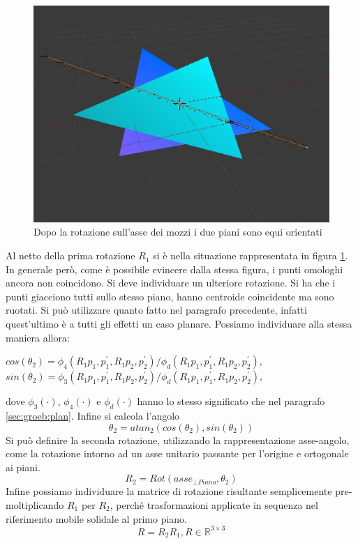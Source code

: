 \begin{figure}[h]
	\centering
	\includegraphics[width=420pt]{imgs/PianiSuStessoPiano.jpg}
	\caption{Dopo la rotazione sull'asse dei mozzi i due piani sono equi orientati}
	\label{rot:gb:samePlane}
\end{figure}

Al netto della prima rotazione $R_1$ si è nella situazione rappresentata in figura \ref{rot:gb:samePlane}. In generale però, come è possibile evincere dalla stessa figura, i punti omologhi ancora non coincidono. Si deve individuare un ulteriore rotazione.
Si ha che i punti giacciono tutti sullo stesso piano, hanno centroide coincidente ma sono ruotati. Si può utilizzare quanto fatto nel paragrafo precedente, infatti quest'ultimo è a tutti gli effetti un caso planare.
Possiamo individuare alla stessa maniera allora:
\begin{center}
	$cos(\theta_2) = \phi_4(R_1p_1, p_1^{'}, R_1p_2, p_2^{'})/\phi_d(R_1p_1, p_1^{'}, R_1p_2, p_2^{'}), \,\,$\\
	$sin(\theta_2) = \phi_3(R_1p_1, p_1^{'}, R_1p_2, p_2^{'})/\phi_d(R_1p_1, p_1^{'}, R_1p_2, p_2^{'}),$
\end{center} 
dove $\phi_3(\cdot)$, $\phi_4(\cdot)$ e $\phi_d(\cdot)$ hanno lo stesso significato che nel paragrafo \ref{sec:groeb:plan}. Infine si calcola l'angolo
\begin{equation}
	\theta_2 = atan_2(cos(\theta_2), sin(\theta_2))
\end{equation} 
Si può definire la seconda rotazione, utilizzando la rappresentazione asse-angolo, come la rotazione intorno ad un asse unitario passante per l'origine e ortogonale ai piani.
\begin{equation}
R_2 = Rot(asse_{\bot Piano}, \theta_2)
\end{equation} 
Infine possiamo individuare la matrice di rotazione risultante semplicemente pre-moltiplicando $R_1$ per $R_2$, perché trasformazioni applicate in sequenza nel riferimento mobile solidale al primo piano.
\begin{equation}
	R = R_2R_1, R \in \mathbb{R}^{3 \times 3}
\end{equation}

